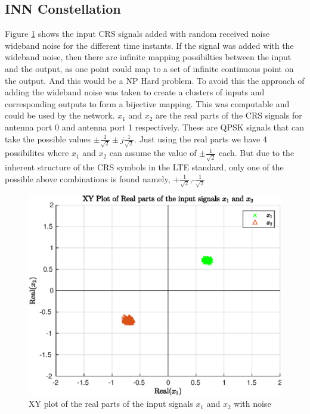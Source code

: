 \subsection{INN Constellation}\label{ssec:INNConstellation}

Figure \ref{fig:INNxn} shows the input CRS signals added with random received noise wideband noise for the different time instants. If the signal was added with the wideband noise, then there are infinite mapping possibilties between the input and the output, as one point could map to a set of infinite continuous point on the output. And this would be a NP Hard problem. To avoid this the approach of adding the wideband noise was taken to create a clusters of inputs and corresponding outputs to form a bijective mapping. This was computable and could be used by the network. $x_1$ and $x_2$ are the real parts of the CRS signals for antenna port 0 and antenna port 1 respectively. These are QPSK signals that can take the possible values  $\pm \frac{1}{\sqrt{2}} \pm j \frac{1}{\sqrt{2}}$. Just using the real parts we have 4 possibilites where $x_1$ and $x_2$ can assume the value of $\pm \frac{1}{\sqrt{2}}$ each. But due to the inherent structure of the CRS symbols in the LTE standard, only one of the possible above combinations is found namely, +$\frac{1}{\sqrt{2}}$,-$\frac{1}{\sqrt{2}}$

\begin{figure}[!htb]
    \centering
    \includegraphics[width=\linewidth]{images/INNxn.eps}
    \caption{XY plot of the real parts of the input signals $x_1$ and $x_2$ with noise}
    \label{fig:INNxn}
\end{figure}

